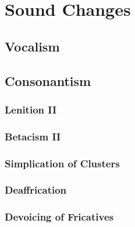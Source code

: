 \documentclass{report}[12pt]
\begin{document}
\section{Sound Changes}

\subsection{Vocalism}

\subsection{Consonantism}

\subsubsection*{Lenition II}

\begin{tcolorbox}

\end{tcolorbox}

\subsubsection*{Betacism II}

\begin{tcolorbox}

\end{tcolorbox}

\subsubsection*{Simplication of Clusters}

\begin{tcolorbox}
  
\end{tcolorbox}

\subsubsection*{Deaffrication}

\begin{tcolorbox}

\end{tcolorbox}

\subsubsection*{Devoicing of Fricatives}
\end{document}
